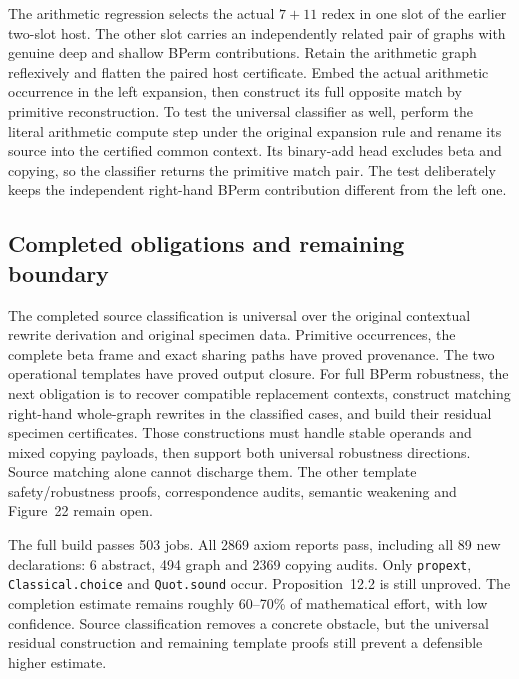 The arithmetic regression selects the actual $7+11$ redex in one slot of
the earlier two-slot host. The other slot carries an independently related
pair of graphs with genuine deep and shallow BPerm contributions. Retain
the arithmetic graph reflexively and flatten the paired host certificate.
Embed the actual arithmetic occurrence in the left expansion, then construct
its full opposite match by primitive reconstruction. To test the universal
classifier as well, perform the literal arithmetic compute step under the
original expansion rule and rename its source into the certified common
context. Its binary-add head excludes beta and copying, so the classifier
returns the primitive match pair. The test deliberately keeps the independent
right-hand BPerm contribution different from the left one.


\subsection{Completed obligations and remaining boundary}
The completed source classification is universal over the original
contextual rewrite derivation and original specimen data. Primitive
occurrences, the complete beta frame and exact sharing paths have proved
provenance. The two operational templates have proved output closure.
For full BPerm robustness, the next obligation is to recover compatible
replacement contexts, construct matching right-hand whole-graph rewrites
in the classified cases, and build their residual specimen certificates.
Those constructions must handle stable operands and mixed copying payloads,
then support both universal robustness directions. Source matching alone
cannot discharge them. The other template safety/robustness proofs,
correspondence audits, semantic weakening and Figure~22 remain open.

The full build passes 503 jobs. All 2869 axiom reports pass, including all
89 new declarations: 6 abstract, 494 graph and 2369 copying audits. Only
\texttt{propext}, \texttt{Classical.choice} and \texttt{Quot.sound} occur.
Proposition~12.2 is still unproved. The completion estimate remains roughly
60--70\% of mathematical effort, with low confidence. Source classification
removes a concrete obstacle, but the universal residual construction and
remaining template proofs still prevent a defensible higher estimate.
